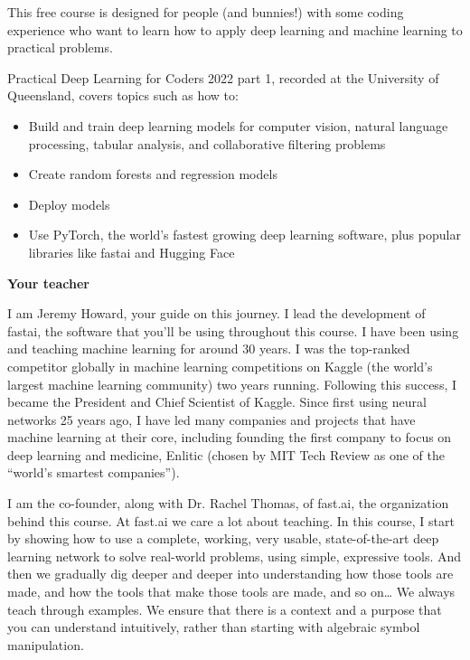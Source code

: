 		This free course is designed for people (and bunnies!) with some coding experience who want to learn how to apply deep learning and machine learning to practical problems.\newline
		
		\noindent Practical Deep Learning for Coders 2022 part 1, recorded at the University of Queensland, covers topics such as how to:
		\begin{itemize}
			\item Build and train deep learning models for computer vision, natural language processing, tabular analysis, and collaborative filtering problems
			\item Create random forests and regression models
			\item Deploy models
			\item Use PyTorch, the world’s fastest growing deep learning software, plus popular libraries like fastai and Hugging Face
		\end{itemize}
		
		
		
		\noindent\textbf{Your teacher}
		
		I am Jeremy Howard, your guide on this journey. I lead the development of fastai, the software that you’ll be using throughout this course. I have been using and teaching machine learning for around 30 years. I was the top-ranked competitor globally in machine learning competitions on Kaggle (the world’s largest machine learning community) two years running. Following this success, I became the President and Chief Scientist of Kaggle. Since first using neural networks 25 years ago, I have led many companies and projects that have machine learning at their core, including founding the first company to focus on deep learning and medicine, Enlitic (chosen by MIT Tech Review as one of the “world’s smartest companies”).
		
		I am the co-founder, along with Dr. Rachel Thomas, of fast.ai, the organization behind this course. At fast.ai we care a lot about teaching. In this course, I start by showing how to use a complete, working, very usable, state-of-the-art deep learning network to solve real-world problems, using simple, expressive tools. And then we gradually dig deeper and deeper into understanding how those tools are made, and how the tools that make those tools are made, and so on… We always teach through examples. We ensure that there is a context and a purpose that you can understand intuitively, rather than starting with algebraic symbol manipulation.
		
